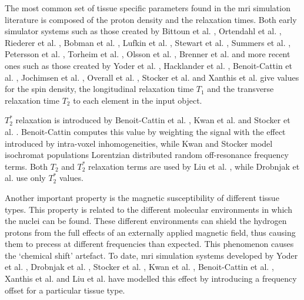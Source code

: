 \hfill

The most common set of tissue specific parameters 
found in the \ac{mri} simulation literature is composed of the proton density and the relaxation times.
Both early simulator systems such as those created by
Bittoun et al. \cite{Bittoun1984},
Ortendahl et al. \cite{Ortendahl1984},
Riederer et al. \cite{Riederer1984},
Bobman et al. \cite{Bobman1985},
Lufkin et al. \cite{Lufkin1986},
Stewart et al. \cite{Stewart1986},
Summers et al. \cite{Summers1986},
Petersson et al. \cite{Petersson1993},
Torheim et al. \cite{Torheim1994}, 
Olsson et al. \cite{Olsson1995},
Brenner et al. \cite{Brenner1997} and
more recent ones such as those created by
Yoder et al. \cite{Yoder2004},
Hacklander et al. \cite{Hacklander2005},
Benoit-Cattin et al. \cite{Benoit-Cattin2005},
Jochimsen et al. \cite{Jochimsen2004},
Overall et al. \cite{Overall2007},
Stocker et al. \cite{Stocker2010} and
Xanthis et al. \cite{Xanthis2014}
give values for the spin density, the longitudinal relaxation time $T_1$ and the transverse relaxation time $T_2$ to each element in the input object.

\hfill

$T_2^*$ relaxation is introduced by Benoit-Cattin et al. \cite{Benoit-Cattin2005},
Kwan et al. \cite{Kwan1997} 
and Stocker et al. \cite{Stocker2010}.
Benoit-Cattin computes this value by weighting the signal with the effect introduced by intra-voxel inhomogeneities,
while Kwan and Stocker model isochromat populations Lorentzian distributed random off-resonance frequency terms.
Both $T_2$ and $T_2^*$ relaxation terms are used by Liu et al. \cite{Liu2014}, while 
Drobnjak et al. \cite{Drobnjak2006} use only $T_2^*$ values.
 
\hfill

Another important property is the magnetic susceptibility of different tissue types.
This property is related to the different molecular environments in which the nuclei can be found.
These different environments can shield the hydrogen protons from the full effects of an externally applied magnetic field, thus causing them to precess at different frequencies than expected.
This phenomenon causes the `chemical shift' artefact.
To date, \ac{mri} simulation systems developed by
Yoder et al. \cite{Yoder2004}, 
Drobnjak et al. \cite{Drobnjak2006}, 
Stocker et al. \cite{Stocker2010}, 
Kwan et al. \cite{Kwan1999}, 
Benoit-Cattin et al. \cite{Benoit-Cattin2005}, 
Xanthis et al. \cite{Xanthis2014} and 
Liu et al. \cite{Liu2013} 
have modelled this effect by 
introducing a frequency offset for a particular tissue type.


